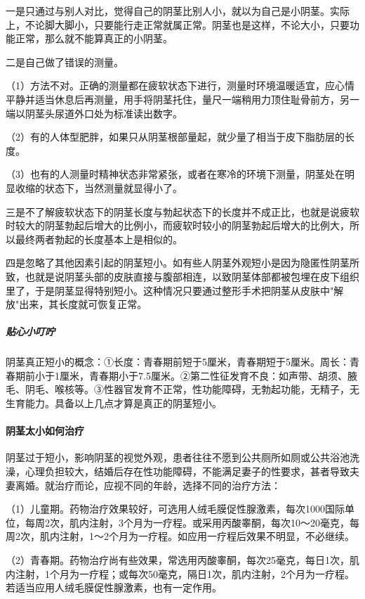 一是只通过与别人对比，觉得自己的阴茎比别人小，就以为自己是小阴茎。实际上，不论脚大脚小，只要能行走正常就属正常。阴茎也是这样，不论大小，只要功能正常，那么就不能算真正的小阴茎。

二是自己做了错误的测量。

（1）方法不对。正确的测量都在疲软状态下进行，测量时环境温暖适宜，应心情平静并适当休息后再测量，用手将阴茎托住，量尺一端稍用力顶住耻骨前方，另一端以阴茎头尿道外口处为标准读出数字。

（2）有的人体型肥胖，如果只从阴茎根部量起，就少量了相当于皮下脂肪层的长度。

（3）也有的人测量时精神状态非常紧张，或者在寒冷的环境下测量，阴茎处在明显收缩的状态下，当然测量就显得小了。

三是不了解疲软状态下的阴茎长度与勃起状态下的长度并不成正比，也就是说疲软时较大的阴茎勃起后增大的比例小，而疲软时较小的阴茎勃起后增大的比例大，所以最终两者勃起的长度基本上是相似的。

四是忽略了其他因素引起的阴茎短小。如有些人阴茎外观短小是因为隐匿性阴茎所致，也就是说阴茎头部的皮肤直接与腹部相连，以致阴茎体部都被包埋在皮下组织里了，于是阴茎显得特别短小。这种情况只要通过整形手术把阴茎从皮肤中"解放"出来，其长度就可恢复正常。

\subparagraph{贴心小叮咛}

阴茎真正短小的概念：①长度：青春期前短于5厘米，青春期短于5厘米。周长：青春期前小于1厘米，青春期小于7.5厘米。②第二性征发育不良：如声带、胡须、腋毛、阴毛、喉核等。③性器官发育不正常，性功能障碍，无勃起功能，无精子，无生育能力。具备以上几点才算是真正的阴茎短小。

\paragraph{阴茎太小如何治疗}

阴茎过于短小，影响阴茎的视觉外观，患者往往不愿到公共厕所如厕或公共浴池洗澡，心理负担较大，结婚后存在性功能障碍，不能满足妻子的性要求，甚者导致夫妻离婚。就治疗而论，应视不同的年龄，选择不同的治疗方法：

（1）儿童期。药物治疗效果较好，可选用人绒毛膜促性腺激素，每次1000国际单位，每周2次，肌内注射，3个月为一疗程。或采用丙酸睾酮，每次10～20毫克，每周2次，肌内注射，1～2个月为一疗程。如应用一疗程后效果不明显，不必继续。

（2）青春期。药物治疗尚有些效果，常选用丙酸睾酮，每次25毫克，每日1次，肌内注射，1个月为一疗程；或每次50毫克，隔日1次，肌内注射，2个月为一疗程。若适当应用人绒毛膜促性腺激素，也有一定作用。

